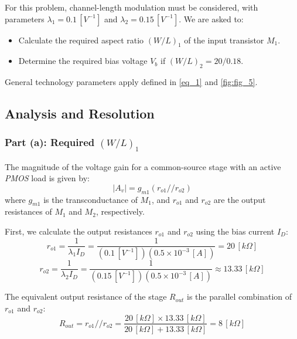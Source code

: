 \documentclass[12pt,a4paper]{article}
\begin{document}
For this problem, channel-length modulation must be considered, with parameters $\lambda_{1} = 0.1 \, [V^{-1}]$ and $\lambda_{2} = 0.15 \, [V^{-1}]$. We are asked to:
\begin{itemize}
    \item[(a)] Calculate the required aspect ratio $(W/L)_{1}$ of the input transistor $M_{1}$.
    \item[(b)] Determine the required bias voltage $V_{b}$ if $(W/L)_{2} = 20/0.18$.
\end{itemize}

General technology parameters apply defined in \autoref{eq_1} and \autoref{fig:fig_5}.


\subsection{Analysis and Resolution}                                \label{sec_6.2}
\subsubsection{Part (a): Required $(W/L)_{1}$}                      \label{sec_6.2.1}
The magnitude of the voltage gain for a common-source stage with an active \textit{PMOS} load is given by:
\begin{equation}
    |A_{v}| = g_{m1} (r_{o1} // r_{o2})
    \label{eq_40}
\end{equation}
where $g_{m1}$ is the transconductance of $M_{1}$, and $r_{o1}$ and $r_{o2}$ are the output resistances of $M_{1}$ and $M_{2}$, respectively.

First, we calculate the output resistances $r_{o1}$ and $r_{o2}$ using the bias current $I_{D}$:
\begin{equation}
    r_{o1} = \frac{1}{\lambda_{1} I_{D}} = \frac{1}{(0.1 \, [V^{-1}]) (0.5 \times 10^{-3} \, [A])} = 20 \, [k\Omega]
    \label{eq_41}
\end{equation}
\begin{equation}
    r_{o2} = \frac{1}{\lambda_{2} I_{D}} = \frac{1}{(0.15 \, [V^{-1}]) (0.5 \times 10^{-3} \, [A])} \approx 13.33 \, [k\Omega]
    \label{eq_42}
\end{equation}

The equivalent output resistance of the stage $R_{out}$ is the parallel combination of $r_{o1}$ and $r_{o2}$:
\begin{equation}
    R_{out} = r_{o1} // r_{o2} = \frac{20 \, [k\Omega] \times 13.33 \, [k\Omega]}{20 \, [k\Omega] + 13.33 \, [k\Omega]} = 8 \, [k\Omega]
    \label{eq_43}
\end{equation}
\end{document}
